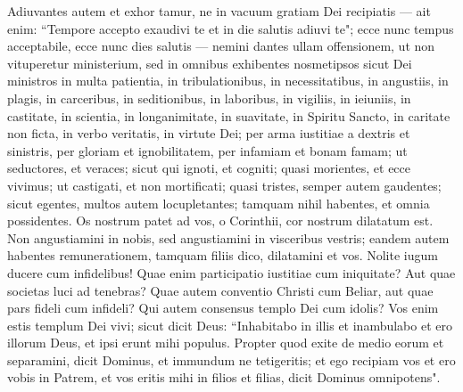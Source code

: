 \begin{biblechapter}  
\verse Adiuvantes autem et exhor tamur, ne in vacuum gratiam Dei recipiatis  
\verse — ait enim: “Tempore accepto exaudivi te et in die salutis adiuvi te"; ecce nunc tempus acceptabile, ecce nunc dies salutis — 
\verse nemini dantes ullam offensionem, ut non vituperetur ministerium, 
\verse sed in omnibus exhibentes nosmetipsos sicut Dei ministros in multa patientia, in tribulationibus, in necessitatibus, in angustiis, 
\verse in plagis, in carceribus, in seditionibus, in laboribus, in vigiliis, in ieiuniis, 
\verse in castitate, in scientia, in longanimitate, in suavitate, in Spiritu Sancto, in caritate non ficta, 
\verse in verbo veritatis, in virtute Dei; per arma iustitiae a dextris et sinistris,  
\verse per gloriam et ignobilitatem, per infamiam et bonam famam; ut seductores, et veraces; 
\verse sicut qui ignoti, et cogniti; quasi morientes, et ecce vivimus; ut castigati, et non mortificati; 
\verse quasi tristes, semper autem gaudentes; sicut egentes, multos autem locupletantes; tamquam nihil habentes, et omnia possidentes. 
\verse Os nostrum patet ad vos, o Corinthii, cor nostrum dilatatum est. 
\verse Non angustiamini in nobis, sed angustiamini in visceribus vestris; 
\verse eandem autem habentes remunerationem, tamquam filiis dico, dilatamini et vos. 
\verse Nolite iugum ducere cum infidelibus! Quae enim participatio iustitiae cum iniquitate? Aut quae societas luci ad tenebras? 
\verse Quae autem conventio Christi cum Beliar, aut quae pars fideli cum infideli? 
\verse Qui autem consensus templo Dei cum idolis? Vos enim estis templum Dei vivi; sicut dicit Deus: “Inhabitabo in illis et inambulabo et ero illorum Deus, et ipsi erunt mihi populus. 
\verse Propter quod exite de medio eorum et separamini, dicit Dominus, et immundum ne tetigeritis; et ego recipiam vos 
\verse et ero vobis in Patrem, et vos eritis mihi in filios et filias, dicit Dominus omnipotens". 
\end{biblechapter}

